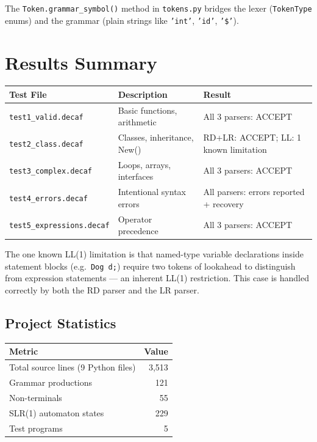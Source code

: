 \documentclass[12pt,a4paper]{article}
\begin{document}
The \texttt{Token.grammar\_symbol()} method in \texttt{tokens.py} bridges the
lexer (\texttt{TokenType} enums) and the grammar (plain strings like
\texttt{'int'}, \texttt{'id'}, \texttt{'\$'}).

\section{Results Summary}

\begin{center}
\begin{tabularx}{\linewidth}{lXX}
\toprule
\textbf{Test File} & \textbf{Description} & \textbf{Result} \\
\midrule
\texttt{test1\_valid.decaf}      & Basic functions, arithmetic  & All 3 parsers: ACCEPT \\
\texttt{test2\_class.decaf}      & Classes, inheritance, New()  & RD+LR: ACCEPT; LL: 1 known limitation\\
\texttt{test3\_complex.decaf}    & Loops, arrays, interfaces    & All 3 parsers: ACCEPT \\
\texttt{test4\_errors.decaf}     & Intentional syntax errors    & All parsers: errors reported + recovery\\
\texttt{test5\_expressions.decaf}& Operator precedence          & All 3 parsers: ACCEPT \\
\bottomrule
\end{tabularx}
\end{center}

The one known LL(1) limitation is that named-type variable declarations inside
statement blocks (e.g.\ \texttt{Dog d;}) require two tokens of lookahead to
distinguish from expression statements — an inherent LL(1) restriction. This case
is handled correctly by both the RD parser and the LR parser.

\subsection*{Project Statistics}
\begin{center}
\begin{tabular}{lr}
\toprule
\textbf{Metric} & \textbf{Value} \\
\midrule
Total source lines (9 Python files) & 3{,}513 \\
Grammar productions                  & 121 \\
Non-terminals                        & 55 \\
SLR(1) automaton states              & 229 \\
Test programs                        & 5 \\
\bottomrule
\end{tabular}
\end{center}
\end{document}
